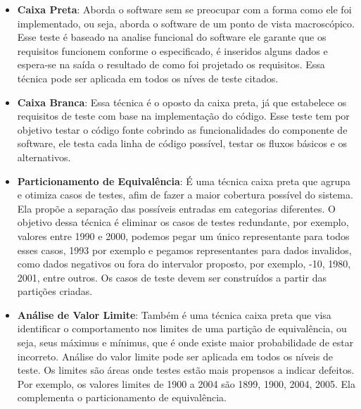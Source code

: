 \begin{itemize}
  \item \textbf{Caixa Preta}: Aborda o software sem se preocupar com a forma como ele foi implementado, ou seja,
    aborda o software de um ponto de vista macroscópico. Esse teste é baseado na analise funcional do software ele
    garante que os requisitos funcionem conforme o especificado, é inseridos alguns dados e espera-se na saída o
    resultado de como foi projetado os requisitos. Essa técnica pode ser aplicada em todos os níves de teste citados.
  \item \textbf{Caixa Branca}: Essa técnica é o oposto da caixa preta, já que estabelece os requisitos de teste com
    base na implementação do código. Esse teste tem por objetivo testar o código fonte cobrindo as funcionalidades
    do componente de software, ele testa cada linha de código possível, testar os fluxos básicos e os alternativos.
  \item \textbf{Particionamento de Equivalência}: É uma técnica caixa preta que agrupa e otimiza casos de testes,
    afim de fazer a maior cobertura possível do sistema. Ela propõe a separação das possíveis entradas em
    categorias diferentes. O objetivo dessa técnica é eliminar os casos de testes redundante, por exemplo,
    valores entre 1990 e 2000, podemos pegar um único representante para todos esses casos, 1993 por exemplo
    e pegamos representantes para dados invalidos, como dados negativos ou fora do intervalor proposto, por
    exemplo, -10, 1980, 2001, entre outros. Os casos de teste devem ser construídos a partir das partições criadas.
  \item \textbf{Análise de Valor Limite}: Também é uma técnica caixa preta que visa identificar o comportamento nos
    limites de uma partição de equivalência, ou seja, seus máximus e mínimus, que é onde existe maior probabilidade de
    estar incorreto. Análise do valor limite pode ser aplicada em todos os níveis de teste. Os limites são áreas
    onde testes estão mais propensos a indicar defeitos. Por exemplo, os valores limites de 1900 a 2004 são 1899,
    1900, 2004, 2005. Ela complementa o particionamento de equivalência.
\end{itemize}

